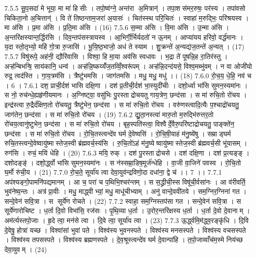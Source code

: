 7.5.5
सू॒प॒सदा॑ मे भूया॒ मा मा॑ हिसीः । तपो॒ष्व॑ग्ने॒ अन्त॑रा अ॒मित्रान्॑ । तपा॒शस॑मर॒रुषः॒ पर॑स्य । तपा॑वसो चिकिता॒नो अ॒चित्तान्॑ । वि ते॑ तिष्ठन्ताम॒जरा॑ अ॒यासः॑ । चित॑स्स्थ परि॒चितः॑ । स्वाहा॑ म॒रुद्भिः॒ परि॑श्रयस्व । मा अ॑सि । प्र॒मा अ॑सि । प्र॒ति॒मा अ॑सि । (16)
7.5.6
स॒म्मा अ॑सि । वि॒मा अ॑सि । उ॒न्मा अ॑सि । अ॒न्तरि॑क्षस्यान्त॒र्द्धिर॑सि । दिव॒न्तप॑सस्त्रायस्व । आ॒भिर्गी॒र्भिर्यदतो॑ न ऊ॒नम् । आप्या॑यय हरिवो॒ वर्द्ध॑मानः । य॒दा स्तो॒तृभ्यो॒ महि॑ गो॒त्रा रु॒जासि॑ । भू॒यि॒ष्ठ॒भाजो॒ अध॑ ते स्याम । शु॒क्रन्ते॑ अ॒न्यद्य॑ज॒तन्ते॑ अ॒न्यत् । (17)
7.5.7
विषु॑रूपे॒ अह॑नी॒ द्यौरि॑वासि । विश्वा॒ हि मा॒या अव॑सि स्वधावः । भ॒द्रा ते॑ पूषन्नि॒ह रा॒तिर॑स्तु । अऱ्ह॑न्बिभऱ्षि॒ साय॑कानि॒ धन्व॑ । अऱ्ह॑न्नि॒ष्कय्यँ॑ज॒तव्विँ॒श्वरू॑पम् । अऱ्ह॑न्नि॒दन्द॑यसे॒ विश्व॒मब्भु॑वम् । न वा ओजी॑यो रुद्र॒ त्वद॑स्ति । गा॒य॒त्रम॑सि । त्रैष्टु॑भमसि । जाग॑तमसि । मधु॒ मधु॒ मधु॑ ।। (18)
7.6.0
रो॒च॒य॒ धे॒हि॒ नव॑ च । 6 ।
7.6.1
दश॒ प्राची॒र्दश॑ भासि दक्षि॒णा । दश॑ प्र॒तीची॒र्दश॑ भा॒स्युदी॑चीः । दशो॒र्ध्वा भा॑सि सुमन॒स्यमा॑नः । स नो॒ रुच॑न्धे॒ह्यहृ॑णीयमानः । अ॒ग्निष्ट्वा॒ वसु॑भिः पु॒रस्ताद्रोचयतु गाय॒त्रेण॒ छन्द॑सा । स मा॑ रुचि॒तो रो॑चय । इन्द्र॑स्त्वा रु॒द्रैर्द॑क्षिण॒तो रो॑चयतु॒ त्रैष्टु॑भेन॒ छन्द॑सा । स मा॑ रुचि॒तो रो॑चय । वरु॑णस्त्वादि॒त्यैः प॒श्चाद्रो॑चयतु॒ जाग॑तेन॒ छन्द॑सा । स मा॑ रुचि॒तो रो॑चय । (19)
7.6.2
द्यु॒ता॒नस्त्वा॑ मारु॒तो म॒रुद्भि॑रुत्तर॒तो रो॑चय॒त्वानु॑ष्टुभेन॒ छन्द॑सा । स मा॑ रुचि॒तो रो॑चय । बृह॒स्पति॑स्त्वा॒ विश्वैर्दे॒वैरु॒परि॑ष्टाद्रोचयतु॒ पाङ्क्ते॑न॒ छन्द॑सा । स मा॑ रुचि॒तो रो॑चय । रो॒चि॒तस्त्वन्दे॑व घर्म दे॒वेष्वसि॑ । रो॒चि॒षी॒याहं म॑नु॒ष्ये॑षु । सम्राड्घर्म रुचि॒तस्त्वन्दे॒वेष्वायु॑ष्मास्तेज॒स्वी ब्र॑ह्मवर्च॒स्य॑सि । रु॒चि॒तो॑ऽहं म॑नु॒ष्येष्वायु॑ष्मास्तेज॒स्वी ब्र॑ह्मवर्च॒सी भू॑यासम् । रुग॑सि । रुचं॒ मयि॑ धेहि । (20)
7.6.3
मयि॒ रुक् । दश॑ पु॒रस्ताद्रोचसे । दश॑ दक्षि॒णा । दश॑ प्र॒त्यङ्ङ् । दशोदङ्ङ्॑ । दशो॒र्द्ध्वो भा॑सि सुमन॒स्यमा॑नः । स न॑स्सम्रा॒डिष॒मूर्ज॑न्धेहि । वा॒जी वा॒जिने॑ पवस्व । रो॒चि॒तो घ॒र्मो रु॑ची॒य । (21)
7.7.0
रो॒च॒ते॒ सूर्या॑य त्वा देवा॒युव॑न्द्रविणो॒दा दधा॑ना॒ द्वे च॑ ।। 7 ।।
7.7.1
अप॑श्यङ्गो॒पामनि॑पद्यमानम् । आ च॒ परा॑ च प॒थिभि॒श्चर॑न्तम् । स स॒द्ध्रीची॒स्स विषू॑ची॒र्वसा॑नः । आ व॑रीवर्ति॒ भुव॑नेष्व॒न्तः । अत्र॑ प्रा॒वीः । मधु॒ माद्ध्वीभ्यां॒ मधु॒ माधू॑चीभ्याम् । अनु॑ वान्दे॒ववी॑तये । सम॒ग्निर॒ग्निना॑ गत । सन्दे॒वेन॑ सवि॒त्रा । स सूर्ये॑ण रोचते । (22)
7.7.2
स्वाहा॒ सम॒ग्निस्तप॑सा गत । सन्दे॒वेन॑ सवि॒त्रा । स सूर्ये॑णारोचिष्ट । ध॒र्ता दि॒वो विभा॑सि॒ रज॑सः । पृ॒थि॒व्या ध॒र्ता । उ॒रोर॒न्तरि॑क्षस्य ध॒र्ता । ध॒र्ता दे॒वो दे॒वानाम् । अम॑र्त्यस्तपो॒जाः । हृ॒दे त्वा॒ मन॑से त्वा । दि॒वे त्वा॒ सूर्या॑य त्वा । (23)
7.7.3
ऊ॒र्द्ध्वमि॒म॑द्ध्व॒रङ्कृ॑धि । दि॒वि दे॒वेषु॒ होत्रा॑ यच्छ । विश्वा॑सां भुवां पते । विश्व॑स्य भुवनस्पते । विश्व॑स्य मनसस्पते । विश्व॑स्य वचसस्पते । विश्व॑स्य तपसस्पते । विश्व॑स्य ब्रह्मणस्पते । दे॒व॒श्रूस्त्वन्दे॑व घर्म दे॒वान्पा॑हि । त॒पो॒जाव्वाँच॑म॒स्मे निय॑च्छ देवा॒युवम् । (24)
